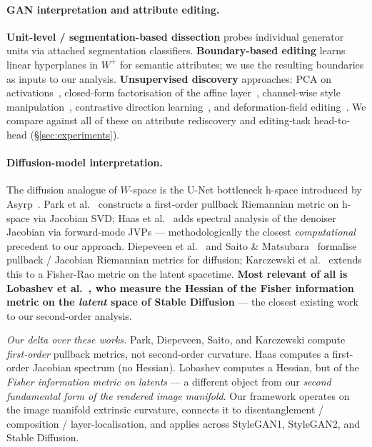
\paragraph{GAN interpretation and attribute editing.}
\textbf{Unit-level / segmentation-based dissection}
\cite{Bau2019GANDissection} probes individual generator units via
attached segmentation classifiers. \textbf{Boundary-based editing}
\cite{Shen2020InterFaceGAN, Yang2020HiGAN} learns linear hyperplanes
in $W^+$ for semantic attributes; we use the resulting boundaries as
inputs to our analysis. \textbf{Unsupervised discovery} approaches:
PCA on activations~\cite{Harkonen2020GANSpace}, closed-form
factorisation of the affine layer~\cite{Shen2021SeFa}, channel-wise
style manipulation~\cite{Wu2021StyleSpace}, contrastive direction
learning~\cite{Yuksel2021LatentCLR, Ren2022DisCo}, and
deformation-field editing~\cite{Pan2023DragGAN}. We compare against
all of these on attribute rediscovery and editing-task head-to-head
(§\ref{sec:experiments}).

\paragraph{Diffusion-model interpretation.}
The diffusion analogue of $W$-space is the U-Net bottleneck h-space
introduced by Asyrp~\cite{Kwon2023Asyrp}. Park et
al.~\cite{Park2023Riemannian} constructs a first-order pullback
Riemannian metric on h-space via Jacobian SVD;
Haas et al.~\cite{Haas2024Hspace} adds spectral analysis of the
denoiser Jacobian via forward-mode JVPs --- methodologically the
closest \emph{computational} precedent to our approach.
Diepeveen et al.~\cite{Diepeveen2025ScoreBasedPullback} and Saito \&
Matsubara~\cite{Saito2025Tangential} formalise pullback / Jacobian
Riemannian metrics for diffusion;
Karczewski et al.~\cite{Karczewski2025Spacetime} extends this to a
Fisher-Rao metric on the latent spacetime.
\textbf{Most relevant of all is Lobashev et al.~\cite{Lobashev2025HessianLatent},
who measure the Hessian of the Fisher information metric on the
\emph{latent} space of Stable Diffusion} --- the closest existing work
to our second-order analysis.

\emph{Our delta over these works.} Park, Diepeveen, Saito, and
Karczewski compute \emph{first-order} pullback metrics, not
second-order curvature. Haas computes a first-order Jacobian
spectrum (no Hessian). Lobashev computes a Hessian, but of the
\emph{Fisher information metric on latents} --- a different object
from our \emph{second fundamental form of the rendered image
manifold}. Our framework operates on the image manifold extrinsic
curvature, connects it to disentanglement / composition /
layer-localisation, and applies across StyleGAN1, StyleGAN2, and
Stable Diffusion.

